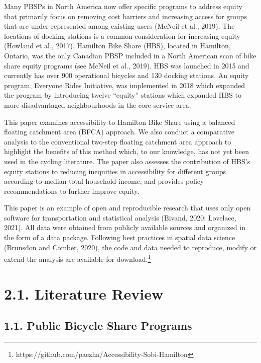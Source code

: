\documentclass[]{elsarticle} %
\begin{document}
Many PBSPs in North America now offer specific programs to address
equity that primarily focus on removing cost barriers and increasing
access for groups that are under-represented among existing users
(McNeil et al., 2019). The locations of docking stations is a common
consideration for increasing equity (Howland et al., 2017). Hamilton
Bike Share (HBS), located in Hamilton, Ontario, was the only Canadian
PBSP included in a North American scan of bike share equity programs
(see McNeil et al., 2019). HBS was launched in 2015 and currently has
over 900 operational bicycles and 130 docking stations. An equity
program, Everyone Rides Initiative, was implemented in 2018 which
expanded the program by introducing twelve ``equity'' stations which
expanded HBS to more disadvantaged neighbourhoods in the core service
area.

This paper examines accessibility to Hamilton Bike Share using a
balanced floating catchment area (BFCA) approach. We also conduct a
comparative analysis to the conventional two-step floating catchment
area approach to highlight the benefits of this method which, to our
knowledge, has not yet been used in the cycling literature. The paper
also assesses the contribution of HBS's equity stations to reducing
inequities in accessibility for different groups according to median
total household income, and provides policy recommendations to further
improve equity.

This paper is an example of open and reproducible research that uses
only open software for transportation and statistical analysis (Bivand,
2020; Lovelace, 2021). All data were obtained from publicly available
sources and organized in the form of a data package. Following best
practices in spatial data science (Brunsdon and Comber, 2020), the code
and data needed to reproduce, modify or extend the analysis are
available for download.\footnote{https://github.com/paezha/Accessibility-Sobi-Hamilton}

\hypertarget{literature-review}{%
\section{2.1. Literature Review}\label{literature-review}}

\hypertarget{public-bicycle-share-programs}{%
\subsection{1.1. Public Bicycle Share
Programs}\label{public-bicycle-share-programs}}
\end{document}
